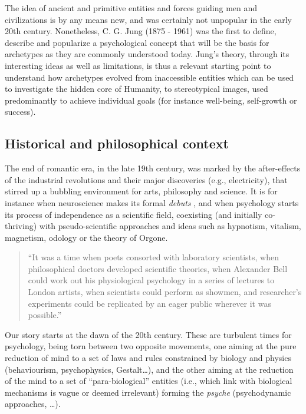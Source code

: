 \documentclass[
]{book}
\begin{document}
The idea of ancient and primitive entities and forces guiding men and civilizations is by any means new, and was certainly not unpopular in the early 20th century. Nonetheless, C. G. Jung (1875 - 1961) was the first to define, describe and popularize a psychological concept that will be the basis for archetypes as they are commonly understood today.
Jung's theory, through its interesting ideas as well as limitations, is thus a relevant starting point to understand how archetypes evolved from inaccessible entities which can be used to investigate the hidden core of Humanity, to stereotypical images, used predominantly to achieve individual goals (for instance well-being, self-growth or success).

\hypertarget{historical-and-philosophical-context}{%
\subsection{Historical and philosophical context}\label{historical-and-philosophical-context}}

The end of romantic era, in the late 19th century, was marked by the after-effects of the industrial revolutions and their major discoveries (e.g., electricity), that stirred up a bubbling environment for arts, philosophy and science. It is for instance when neuroscience makes its formal \emph{debuts} \citep[even though the term ``neuroscience'' would appear only a century later, in the 1960s;][]{rose20155o}, and when psychology starts its process of independence as a scientific field, coexisting (and initially co-thriving) with pseudo-scientific approaches and ideas such as hypnotism, vitalism, magnetism, odology or the theory of Orgone.

\begin{quote}
``It was a time when poets consorted with laboratory scientists,
when philosophical doctors developed scientific theories,
when Alexander Bell could work out his physiological psychology in a series of lectures to London artists,
when scientists could perform as showmen,
and researcher's experiments could be replicated by an eager public wherever it was possible.'' \citep{richardson2001british}
\end{quote}

Our story starts at the dawn of the 20th century. These are turbulent times for psychology, being torn between two opposite movements, one aiming at the pure reduction of mind to a set of laws and rules constrained by biology and physics (behaviourism, psychophysics, Gestalt\ldots), and the other aiming at the reduction of the mind to a set of ``para-biological'' entities (i.e., which link with biological mechanisms is vague or deemed irrelevant) forming the \emph{psyche} (psychodynamic approaches, \ldots).
\end{document}
